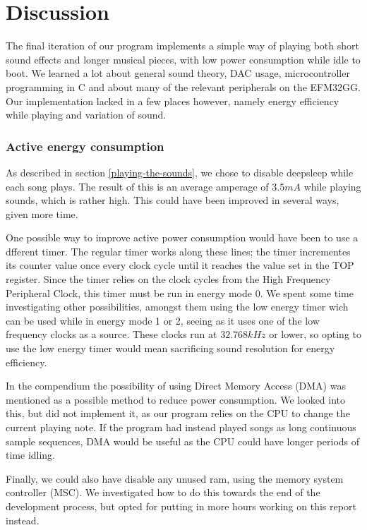 \section{Discussion}

The final iteration of our program implements a simple way of playing both short sound effects and longer musical pieces, with low power consumption while idle to boot. We learned a lot about general sound theory, DAC usage, microcontroller programming in C and about many of the relevant peripherals on the EFM32GG. Our implementation lacked in a few places however, namely energy efficiency while playing and variation of sound.

\subsubsection{Active energy consumption}

As described in section \ref{playing-the-sounds}, we chose to disable deepsleep while each song plays. The result of this is an average amperage of $3.5mA$ while playing sounds, which is rather high. This could have been improved in several ways, given more time.

One possible way to improve active power consumption would have been to use a dfferent timer. The regular timer works along these lines; the timer incrementes its counter value once every clock cycle until it reaches the value set in the TOP register. Since the timer relies on the clock cycles from the High Frequency Peripheral Clock, this timer must be run in energy mode 0. We spent some time investigating other possibilities, amongst them using the low energy timer wich can be used while in energy mode 1 or 2, seeing as it uses one of the low frequency clocks as a source. These clocks run at $32.768 kHz$ or lower, so opting to use the low energy timer would mean sacrificing sound resolution for energy efficiency.

In the compendium the possibility of using Direct Memory Access (DMA) was mentioned as a possible method to reduce power consumption. We looked into this, but did not implement it, as our program relies on the CPU to change the current playing note. If the program had instead played songs as long continuous sample sequences, DMA would be useful as the CPU could have longer periods of time idling.

Finally, we could also have disable any unused ram, using the memory system controller (MSC). We investigated how to do this towards the end of the development process, but opted for putting in more hours working on this report instead.

